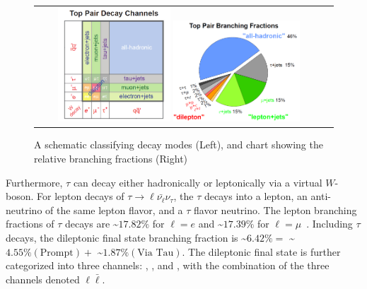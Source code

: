 \begin{figure}[htb]
  \begin{center}
    \begin{tabular}{cc}
        \includegraphics[width=0.40\textwidth]{fig_TopQuark/Top_Pair_Decay_Channels.png}
        \includegraphics[width=0.45\textwidth]{fig_TopQuark/Top_Pair_Branching_Fractions.png}
    \end{tabular}
    \caption{A schematic classifying \ttbar decay modes (Left), and chart showing the relative branching fractions (Right)~\cite{d0_diagrams}
            }
    \label{Top_Pair_Decay_Channels}
  \end{center}
\end{figure}

Furthermore, $\tau$ can decay either hadronically or leptonically via a virtual $W$-boson.
For lepton decays of $\tau \rightarrow \ell \bar{\nu_\ell} \nu_\tau$, the $\tau$ decays into a lepton, an anti-neutrino of the same lepton flavor, and a $\tau$ flavor neutrino.
The lepton branching fractions of $\tau$ decays are \sim$17.82 \%$ for $\ell = e$ and \sim$17.39 \%$ for $\ell = \mu$~\cite{bib:PDG}.
Including $\tau$ decays, the \ttbar dileptonic final state branching fraction is \sim$6.42 \% = $ \sim$4.55 \% (\text{Prompt}) + $ \sim$1.87 \% (\text{Via Tau})$.
The \ttbar dileptonic final state is further categorized into three channels: \ee, \emu, and \mumu, with the combination of the three channels denoted $\ell \bar{\ell}$.


